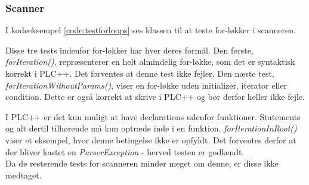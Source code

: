 \subsubsection{Scanner}

I kodeeksempel \ref{code:testforloops} ses klassen til at teste for-løkker i scanneren. 


\noindent Disse tre tests indenfor for-løkker har hver deres formål. Den første, \textit{forIteration()}, repræsenterer en helt almindelig for-løkke, som det er syntaktisk korrekt i PLC++. Det forventes at denne test ikke fejler.
Den næste test, \textit{forIterationWithoutParams()}, viser en for-løkke uden initializer, iterator eller condition. Dette er også korrekt at skrive i PLC++ og bør derfor heller ikke fejle.

I PLC++ er det kun muligt at have declarations udenfor funktioner. Statements og alt dertil tilhørende må kun optræde inde i en funktion. \textit{forIterationInRoot()} viser et eksempel, hvor denne betingelse ikke er opfyldt. Det forventes derfor at der bliver kastet en \textit{ParserException} - herved testen er godkendt.\\

\noindent Da de resterende tests for scanneren minder meget om denne, er disse ikke medtaget. 
